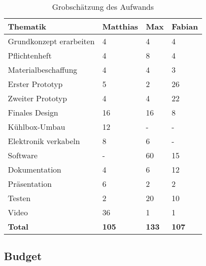 \begin{table}[H]
    \centering
    \caption{Grobschätzung des Aufwands}
    \label{tab:aufwand}
    \begin{tabular}{|l|l|l|l|}
    \hline
    \textbf{Thematik}       & \textbf{Matthias} & \textbf{Max} & \textbf{Fabian} \\ \hline
    Grundkonzept erarbeiten & 4                 & 4            & 4               \\ \hline
    Pflichtenheft           & 4                 & 8            & 4               \\ \hline
    Materialbeschaffung     & 4                 & 4            & 3               \\ \hline
    Erster Prototyp         & 5                 & 2            & 26              \\ \hline
    Zweiter Prototyp        & 4                 & 4            & 22              \\ \hline
    Finales Design          & 16                & 16           & 8               \\ \hline
    Kühlbox-Umbau           & 12                & -            & -               \\ \hline
    Elektronik verkabeln    & 8                 & 6            & -               \\ \hline
    Software                & -                 & 60           & 15              \\ \hline
    Dokumentation           & 4                 & 6            & 12              \\ \hline
    Präsentation            & 6                 & 2            & 2               \\ \hline
    Testen                  & 2                 & 20           & 10              \\ \hline
    Video                   & 36                & 1            & 1               \\ \hline
    \textbf{Total}          & \textbf{105}      & \textbf{133} & \textbf{107}    \\ \hline
    \end{tabular}
    \end{table}

    \pagebreak

\subsection{Budget}

